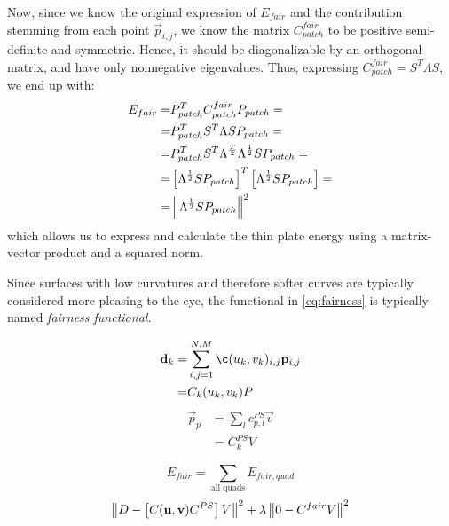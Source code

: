 Now, since we know the original expression of $E_{fair}$ and the contribution stemming from each point $\vec{p}_{i,j}$, we know the matrix $C_{patch}^{fair}$ to be positive semi-definite and symmetric. Hence, it should be diagonalizable by an orthogonal matrix, and have only nonnegative eigenvalues. Thus, expressing $C_{patch}^{fair} = S^T \Lambda S$, we end up with:
\begin{align*}
E_{fair} =& P_{patch}^T C_{patch}^{fair} P_{patch} =
\\
=&  P_{patch}^T S^T \Lambda S P_{patch} = 
\\
=& P_{patch}^T S^T \Lambda^{\frac{T}{2}}\Lambda^{\frac{1}{2}} S P_{patch} =
\\
=& \left[\Lambda^{\frac{1}{2}} S P_{patch}\right]^T\left[\Lambda^{\frac{1}{2}} S P_{patch}\right] =
\\
=& \norm{\Lambda^{\frac{1}{2}} S P_{patch}}^2
\end{align*}
which allows us to express and calculate the thin plate energy using a matrix-vector product and a squared norm.

Since surfaces with low curvatures and therefore softer curves are typically considered more pleasing to the eye, the functional in \autoref{eq:fairness} is typically named \emph{fairness functional}.


\begin{align}
\vec{d}_k = & \sum\limits_{i,j=1}^{N,M} \c(u_k,v_k)_{i,j} \lsControlPointi{i,j}
\\=& C_k (u_k,v_k)P
\end{align}
\begin{align}
\vec{p}_{p} &= \sum\limits_{l} c^{PS}_{p,l} \vec{v} 
\\
&=C_k^{PS}V
\end{align}



\begin{equation}
\label{eq:fairness-sum}
E_{fair} = \sum\limits_{\text{all quads}}E_{fair,quad}
\end{equation}
\begin{equation}
\norm{D - \left[ C(\vec{u},\vec{v}) C^{PS} \right] V }^2 + \lambda \norm{0 - C^{fair} V }^2
\end{equation}

